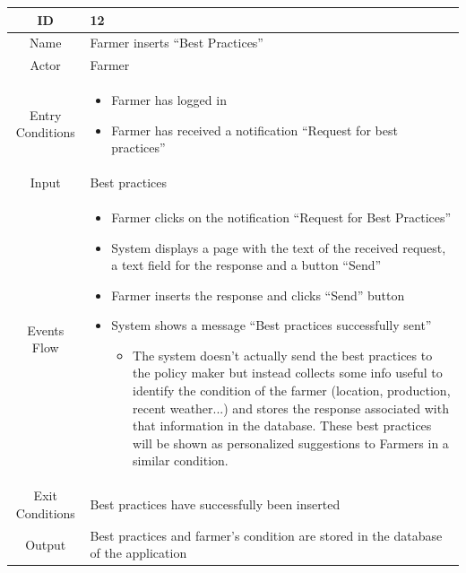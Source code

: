 \documentclass{article}
\begin{document}
\begin{center}
    \begin{longtable}{|c| p{10cm}|}
        \hline
            ID & 12 \\
        \hline
            Name & Farmer inserts “Best Practices”\\
        \hline
            Actor & Farmer \\
        \hline
            Entry Conditions & 
                                \begin{itemize}
                                    \item Farmer has logged in
                                    \item Farmer has received a notification “Request for best practices”
                                \end{itemize}\\
        \hline
            Input & Best practices\\
        \hline
            Events Flow &   \begin{itemize}
                                \item Farmer clicks on the notification “Request for Best Practices”
                                \item System displays a page with the text of the received request, a text field for the response and a button “Send” 
                                \item Farmer inserts the response and clicks “Send” button
                                \item System shows a message “Best practices successfully sent”
                                        \begin{itemize}
                                            \item The system doesn’t actually send the best practices to the policy maker but instead collects some info useful to identify the condition of the farmer (location, production, recent weather...) and stores the response associated with that information in the database. These best practices will be shown as personalized suggestions to Farmers in a similar condition.
                                        \end{itemize}
                            \end{itemize} \\
        \hline
            Exit Conditions & Best practices have successfully been inserted \\
        \hline
            Output & Best practices and farmer’s condition are stored in the database of the application\\

\end{longtable}
\end{center}
\end{document}
